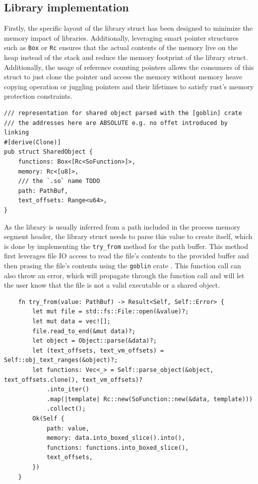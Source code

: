 \subsection{Library implementation}

Firstly, the specific layout of the library struct has been designed to minimize the memory impact of libraries.
Additionally, leveraging smart pointer structures such as \verb|Box| or \verb|Rc| ensures that the actual contents of the memory live on the heap instead of the stack and reduce the memory footprint of the library struct.
Additionally, the usage of reference counting pointers allows the consumers of this struct to just clone the pointer and access the memory without memory heave copying operation or juggling pointers and their lifetimes to satisfy rust's memory protection constraints.

\begin{lstlisting}
/// representation for shared object parsed with the [goblin] crate
/// the addresses here are ABSOLUTE e.g. no offet introduced by linking
#[derive(Clone)]
pub struct SharedObject {
    functions: Box<[Rc<SoFunction>]>,
    memory: Rc<[u8]>,
    /// the `.so` name TODO
    path: PathBuf,
    text_offsets: Range<u64>,
}
\end{lstlisting}

As the library is usually inferred from a path included in the process memory segment header, the library struct needs to parse this value to create itself, which is done by implementing the \verb|try_from| method for the path buffer.
This method first leverages file IO access to read the file's contents to the provided buffer and then prasing the file's contents using the \verb|goblin| crate \cite{m4b_m4bgoblin_2024}.
This function call can also throw an error, which will propagate through the function call and will let the user know that the file is not a valid executable or a shared object.

\begin{lstlisting}
    fn try_from(value: PathBuf) -> Result<Self, Self::Error> {
        let mut file = std::fs::File::open(&value)?;
        let mut data = vec![];
        file.read_to_end(&mut data)?;
        let object = Object::parse(&data)?;
        let (text_offsets, text_vm_offsets) = Self::obj_text_ranges(&object)?;
        let functions: Vec<_> = Self::parse_object(&object, text_offsets.clone(), text_vm_offsets)?
            .into_iter()
            .map(|template| Rc::new(SoFunction::new(&data, template)))
            .collect();
        Ok(Self {
            path: value,
            memory: data.into_boxed_slice().into(),
            functions: functions.into_boxed_slice(),
            text_offsets,
        })
    }
\end{lstlisting}

